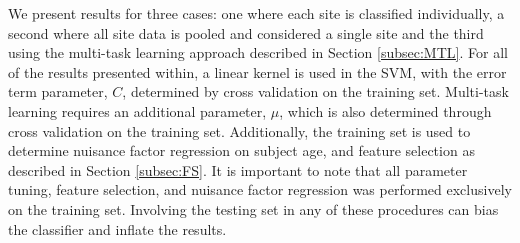 \documentclass{llncs}
\begin{document}
We present results for three cases: one where each site is classified individually, a second where all site data is pooled and considered a single site and the third using the multi-task learning approach described in Section \ref{subsec:MTL}. For all of the results presented within, a linear kernel is used in the SVM, with the error term parameter, $C$,  determined by cross validation on the training set. Multi-task learning requires an additional parameter, $\mu$, which is also determined through cross validation on the training set. Additionally, the training set is used to determine nuisance factor regression on subject age, and feature selection as described in Section \ref{subsec:FS}. It is important to note that all parameter tuning, feature selection, and nuisance factor regression was performed exclusively on the training set. Involving the testing set in any of these procedures can bias the classifier and inflate the results.

\end{document}
